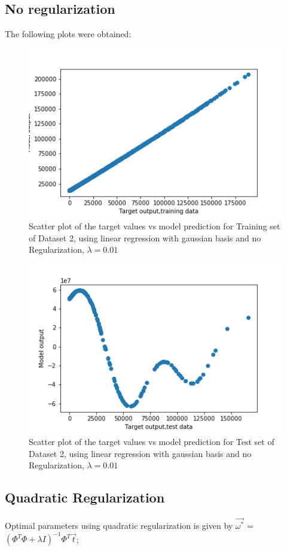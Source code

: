 \documentclass[12pt,a4paper]{article}
\begin{document}
\subsection{No regularization}
The following plots were obtained:
\begin{figure}[H]
     \centering
     \includegraphics[scale=0.5]{images/scatter_ds2noreg.png}
     \caption{Scatter plot of the target values vs model prediction for Training set of Dataset 2, using linear regression with gaussian basis and no Regularization, $\lambda = 0.01 $}
     \label{fig:ds2tr}
\end{figure}
\begin{figure}[H]
    \centering
    \includegraphics[scale=0.5]{images/scatter_ds2noreg_test.png}
    \caption{Scatter plot of the target values vs model prediction for Test set of Dataset 2, using linear regression with gaussian basis and no Regularization, $\lambda = 0.01 $}
    \label{fig:tikhds2tr}
\end{figure}


\subsection{Quadratic Regularization}
Optimal parameters using quadratic regularization is given by $\vec{\omega^*}$ = $(\Phi^T\Phi + \lambda I)^{-1} \Phi^T \vec{t}$;\\
\end{document}
